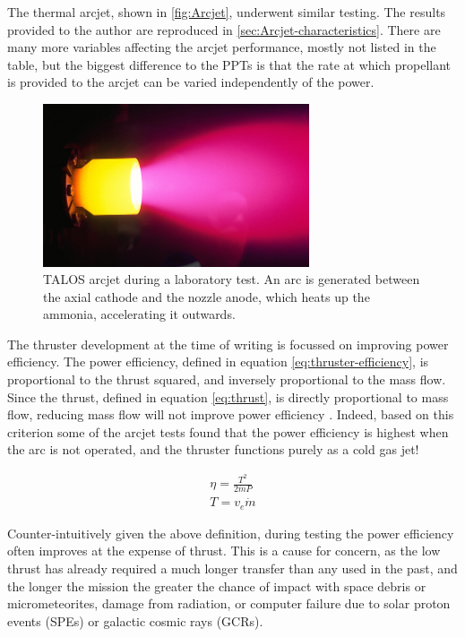 The thermal arcjet, shown in \autoref{fig:Arcjet}, underwent similar testing. The results provided to the author are reproduced in \autoref{sec:Arcjet-characteristics}. There are many more variables affecting the arcjet performance, mostly not listed in the table, but the biggest difference to the PPTs is that the rate at which propellant is provided to the arcjet can be varied independently of the power. 

\begin{figure}
\caption{TALOS arcjet during a laboratory test. An arc is generated between the axial cathode and the nozzle anode, which heats up the ammonia, accelerating it outwards.} \label{fig:Arcjet}
\centering
\includegraphics[width=0.7\textwidth]{Images/hiparc_betrieb.png}
\end{figure}

The thruster development at the time of writing  is focussed on improving power efficiency. The power efficiency, defined in equation \eqref{eq:thruster-efficiency}, is proportional to the thrust squared, and inversely proportional to the mass flow. Since the thrust, defined in equation \eqref{eq:thrust}, is directly proportional to mass flow, reducing mass flow will not improve power efficiency \parencite{Wollenhaupt2011}. Indeed, based on this criterion some of the arcjet tests found that the power efficiency is highest when the arc is not operated, and the thruster functions purely as a cold gas jet! 

\begin{subequations}
\begin{gather}
\eta = \frac{T^2}{2\dot{m}P} \label{eq:thruster-efficiency}\\
T = v_e\dot{m} \label{eq:thrust} 
\end{gather}
\end{subequations}

Counter-intuitively given the above definition, during testing the power efficiency often improves at the expense of thrust. This is a cause for concern, as the low thrust has already required a much longer transfer than any used in the past, and the longer the mission the greater the chance of impact with space debris or micrometeorites, damage from radiation, or computer failure due to solar proton events (SPEs) or galactic cosmic rays (GCRs).

